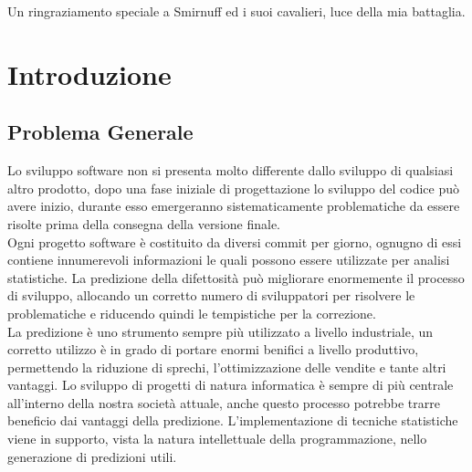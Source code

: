 \documentclass[%
    corpo=12pt,
    twoside,
    oldstyle,
    autoretitolo,
    greek,
    evenboxes,
]{toptesi}
\begin{document}
\acknowledgements
Un ringraziamento speciale a Smirnuff ed i suoi cavalieri, luce della mia battaglia.

\renewcommand{\baselinestretch}{1.1}\normalsize
\indici
\renewcommand{\baselinestretch}{1.5}\normalsize

\mainmatter


\chapter{Introduzione}
\label{chap:intro}
\section{Problema Generale}
Lo sviluppo software non si presenta molto differente dallo sviluppo di qualsiasi altro prodotto, dopo una fase iniziale di progettazione lo sviluppo del codice può avere inizio, durante esso emergeranno sistematicamente problematiche da essere risolte prima della consegna della versione finale.\\
Ogni progetto software è costituito da diversi commit per giorno, ognugno di essi contiene innumerevoli informazioni le quali possono essere utilizzate per analisi statistiche. La predizione della difettosità può migliorare enormemente il processo di sviluppo, allocando un corretto numero di sviluppatori per risolvere le problematiche e riducendo quindi le tempistiche per la correzione.\\
La predizione è uno strumento sempre più utilizzato a livello industriale, un corretto utilizzo è in grado di portare enormi benifici a livello produttivo, permettendo la riduzione di sprechi, l'ottimizzazione delle vendite e tante altri vantaggi. Lo sviluppo di progetti di natura informatica è sempre di più centrale all'interno della nostra società attuale, anche questo processo potrebbe trarre beneficio dai vantaggi della predizione. L'implementazione di tecniche statistiche viene in supporto, vista la natura intellettuale della programmazione, nello generazione di predizioni utili.
\end{document}
